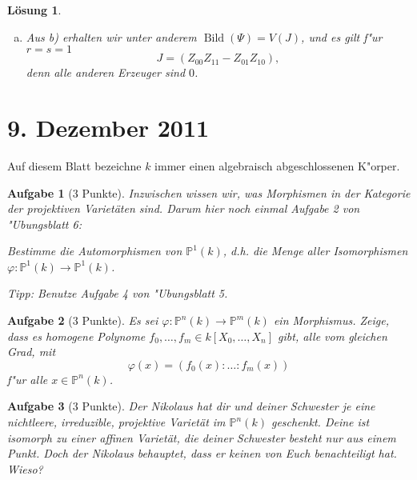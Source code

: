 \documentclass[a4paper, 12pt, numbers=noendperiod, chapterprefix=true, headsepline]{scrbook}
\theoremstyle{break}
\newtheorem{Aufg}{Aufgabe}
\newtheorem{Loes}{L\"osung}
\theoremstyle{nonumberbreak}
\theoremstyle{nonumberplain}
\DeclareMathOperator{\Bild}{Bild}
\newcommand{\IP}{\mathbb{P}}%
\begin{document}
\begin{Loes}
\begin{enumerate}[a)]
	Es sei $z = (z_{00}:\ldots:z_{rs})\in V(J)$. Zun"achst gibt es ein Paar $(i_0,j_0)$, für das $z_{i_0j_0}\neq 0$ gilt. Es ist 
		\[z_{ij}z_{i_0j_0} = z_{i j_0}z_{i_0 j},\]
	was "aquivalent ist zu 
		\[z_{ij} = \frac{z_{ij_0}z_{i_0j}}{z_{i_0j_0}}.\]
	Wir setzen $x_i = z_{ij_0}$ und $y_j=z_{i_0j}$. Dies definiert zwei Punkte $x = (\ldots:x_i:\ldots)\in \IP^r(K)$ und $y = (\ldots:y_j:\ldots)\in \IP^s(K)$, und es gilt
		\[\Psi(x,y) = (\ldots:z_{ij_0}z_{i_0j}:\ldots) = (\ldots: \frac{z_{ij_0}z_{i_0j}}{z_{i_0j_0}}:\ldots) = (\ldots:z_{ij}:\ldots).\]
	Somit ist $z\in \Bild(\Psi)$.

\item
	Aus b) erhalten wir unter anderem $\Bild(\Psi) = V(J)$, und es gilt f"ur $r=s=1$
		\[J = (Z_{00}Z_{11}-Z_{01}Z_{10}),\]
	denn alle anderen Erzeuger sind $0$.
\end{enumerate}\end{Loes}

\newpage
\section{9. Dezember 2011}
\setcounter{Aufg}{0}
\setcounter{Loes}{3}

Auf diesem Blatt bezeichne $k$ immer einen algebraisch abgeschlossenen K"orper.

\begin{Aufg}[3 Punkte]
Inzwischen wissen wir, was Morphismen in der Kategorie der projektiven Variet\"aten sind. Darum hier noch einmal Aufgabe 2 von "Ubungsblatt 6:

Bestimme die Automorphismen von $\IP^1(k)$, d.h. die Menge aller Isomorphismen $\varphi \colon \IP^1(k) \to \IP^1(k)$.

\textit{Tipp:} Benutze Aufgabe 4 von "Ubungsblatt 5.
\end{Aufg}

\begin{Aufg}[3 Punkte]
Es sei $\varphi: \IP^n(k)\to \IP^m(k)$ ein Morphismus. Zeige, dass es homogene Polynome $f_0,\dots,f_m\in k[X_0,\dots,X_n]$ gibt, alle vom gleichen Grad, mit
	\[\varphi(x) = (f_0(x):\ldots :f_m(x))\]
f"ur alle $x\in \IP^n(k)$.
\end{Aufg}

\begin{Aufg}[3 Punkte]
Der Nikolaus hat dir und deiner Schwester je eine nichtleere, irreduzible, projektive Variet\"at im $\IP^n(k)$ geschenkt. Deine ist isomorph zu einer affinen Variet\"at, die deiner Schwester besteht nur aus einem Punkt. Doch der Nikolaus behauptet, dass er keinen von Euch benachteiligt hat. Wieso?
\end{Aufg}
\end{document}
